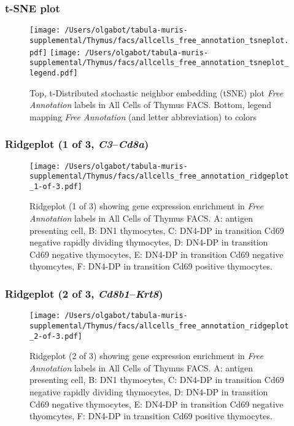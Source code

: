 \clearpage
\subsubsection{t-SNE plot}
\begin{figure}[h]
\centering
\texttt{[image: /Users/olgabot/tabula-muris-supplemental/Thymus/facs/allcells\_free\_annotation\_tsneplot.pdf]}
\texttt{[image: /Users/olgabot/tabula-muris-supplemental/Thymus/facs/allcells\_free\_annotation\_tsneplot\_legend.pdf]}
\caption{Top, t-Distributed stochastic neighbor embedding (tSNE) plot  \emph{Free Annotation} labels in All Cells of Thymus FACS. Bottom, legend mapping \emph{Free Annotation} (and letter abbreviation) to colors}
\end{figure}


\clearpage

\subsubsection{Ridgeplot (1 of 3, \emph{C3}--\emph{Cd8a})}
\begin{figure}[h]
\centering
\texttt{[image: /Users/olgabot/tabula-muris-supplemental/Thymus/facs/allcells\_free\_annotation\_ridgeplot\_1-of-3.pdf]}

\caption{ Ridgeplot (1 of 3)  showing gene expression enrichment in \emph{Free Annotation} labels in All Cells of Thymus FACS. A: antigen presenting cell, B: DN1 thymocytes, C: DN4-DP in transition Cd69 negative rapidly dividing thymocytes, D: DN4-DP in transition Cd69 negative thymocytes, E: DN4-DP in transition Cd69 negative thyomcytes, F: DN4-DP in transition Cd69 positive thymocytes.}
\end{figure}


\clearpage

\subsubsection{Ridgeplot (2 of 3, \emph{Cd8b1}--\emph{Krt8})}
\begin{figure}[h]
\centering
\texttt{[image: /Users/olgabot/tabula-muris-supplemental/Thymus/facs/allcells\_free\_annotation\_ridgeplot\_2-of-3.pdf]}

\caption{ Ridgeplot (2 of 3)  showing gene expression enrichment in \emph{Free Annotation} labels in All Cells of Thymus FACS. A: antigen presenting cell, B: DN1 thymocytes, C: DN4-DP in transition Cd69 negative rapidly dividing thymocytes, D: DN4-DP in transition Cd69 negative thymocytes, E: DN4-DP in transition Cd69 negative thyomcytes, F: DN4-DP in transition Cd69 positive thymocytes.}
\end{figure}



